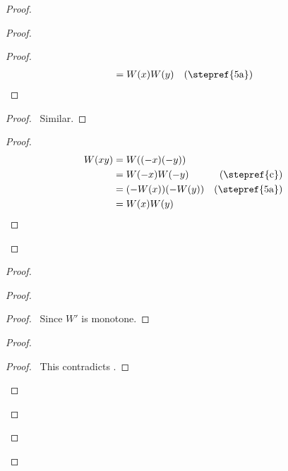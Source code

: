 \documentclass{article}
\let\qed\relax
\theoremstyle{definition}
\begin{document}
\begin{proof}
\begin{proof}
\begin{proof}
\begin{align*}
                    & = W(x)W(y) & (\text{\stepref{5a}})
                \end{align*}
            \end{proof}
            \begin{proof}
                \pf\ Similar.
            \end{proof}
            \begin{proof}
                \pf
                \begin{align*}
                    W(xy) & = W((-x)(-y)) \\
                    & = W(-x) W(-y) & (\text{\stepref{c}}) \\
                    & = (-W(x)) (-W(y)) & (\text{\stepref{5a}})\\
                    & = W(x) W(y)
                \end{align*}
            \end{proof}
        \end{proof}
        \begin{proof}
            \begin{proof}
                \begin{proof}
                    \pf\ Since $W'$ is monotone.
                \end{proof}
                \begin{proof}
                    \qedstep
                    \begin{proof}
                        \pf\ This contradicts .
                    \end{proof}
                \end{proof}
            \end{proof}
        \end{proof}
        \qed
    \end{proof}
\end{document}
